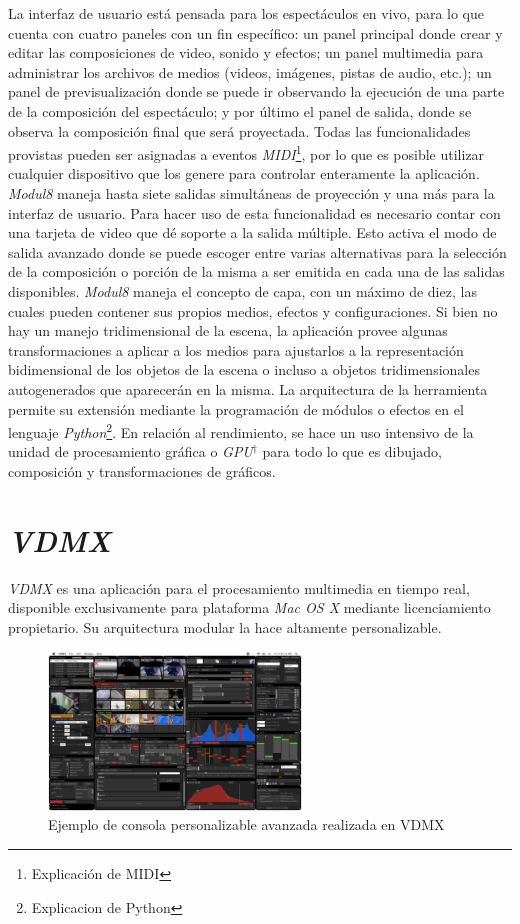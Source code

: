 La interfaz de usuario está pensada para los espectáculos en vivo, para lo que cuenta con cuatro paneles con un fin específico: un panel principal donde crear y editar las composiciones de video, sonido y efectos; un panel multimedia para administrar los archivos de medios (videos, imágenes, pistas de audio, etc.); un panel de previsualización donde se puede ir observando la ejecución de una parte de la composición del espectáculo; y por último el panel de salida, donde se observa la composición final que será proyectada. Todas las funcionalidades provistas pueden ser asignadas a eventos \emph{MIDI}\footnote{Explicación de MIDI}, por lo que es posible utilizar cualquier dispositivo que los genere para controlar enteramente la aplicación.
\emph{Modul8} maneja hasta siete salidas simultáneas de proyección y una más para la interfaz de usuario. Para hacer uso de esta funcionalidad es necesario contar con una tarjeta de video que dé soporte a la salida múltiple. Esto activa el modo de salida avanzado donde se puede escoger entre varias alternativas para la selección de la composición o porción de la misma a ser emitida en cada una de las salidas disponibles. \emph{Modul8} maneja el concepto de capa, con un máximo de diez, las cuales pueden contener sus propios medios, efectos y configuraciones.
Si bien no hay un manejo tridimensional de la escena, la aplicación provee algunas transformaciones a aplicar a los medios para ajustarlos a la representación bidimensional de los objetos de la escena o incluso a objetos tridimensionales autogenerados que aparecerán en la misma.
La arquitectura de la herramienta permite su extensión mediante la programación de módulos o efectos en el lenguaje \emph{Python}\footnote{Explicacion de Python}.
En relación al rendimiento, se hace un uso intensivo de la unidad de procesamiento gráfica o \emph{GPU}$^\dagger$ para todo lo que es dibujado, composición y transformaciones de gráficos.

\section{\emph{VDMX}}
\emph{VDMX} \cite{VDMX} es una aplicación para el procesamiento multimedia en tiempo real, disponible exclusivamente para plataforma \emph{Mac OS X} mediante licenciamiento propietario. Su arquitectura modular la hace altamente personalizable.

\begin{figure}[H]
  \centering
    \includegraphics[width=0.6\textwidth]{./Cap3_aplicaciones/apps-vdmx.png}
  \caption{Ejemplo de consola personalizable avanzada realizada en VDMX} %
  \label{fig:Apps-VDMX}
\end{figure}

